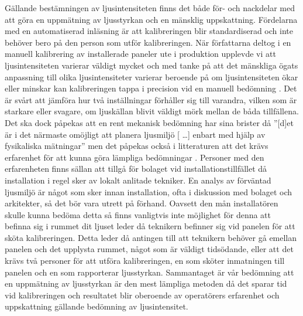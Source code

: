     Gällande bestämningen av ljusintensiteten finns det både för- och nackdelar med att göra en uppmätning av ljusstyrkan och en mänsklig uppskattning. Fördelarna med en automatiserad inläsning är att kalibreringen blir standardiserad och inte behöver bero på den person som utför kalibreringen. När författarna deltog i en manuell kalibrering av installerade paneler ute i produktion upplevde vi att ljusintensiteten varierar väldigt mycket och med tanke på att det mänskliga ögats anpassning till olika ljusintensiteter varierar beroende på om ljusintensiteten ökar eller minskar kan kalibreringen tappa i precision vid en manuell bedömning \cite[s.~273]{aot}.  Det är svårt att jämföra hur två inställningar förhåller sig till varandra, vilken som är starkare eller svagare, om ljuskällan blivit väldigt mörk mellan de båda tillfällena. Det ska dock påpekas att en rent mekanisk bedömning har sina brister då ''[d]et är i det närmaste omöjligt att planera ljusmiljö [ \dots ] enbart med hjälp av fysikaliska mätningar'' men det påpekas också i litteraturen att det krävs erfarenhet för att kunna göra lämpliga bedömningar \cite[s.~278]{aot}. Personer med den erfarenheten finns sällan att tillgå för bolaget vid installationstillfället då installation i regel sker av lokalt anlitade tekniker. En analys av förväntad ljusmiljö är något som sker innan installation, ofta i diskussion med bolaget och arkitekter, så det bör vara utrett på förhand. Oavsett den mån installatören skulle kunna bedöma detta så finns vanligtvis inte möjlighet för denna att befinna sig i rummet dit ljuset leder då teknikern befinner sig vid panelen för att sköta kalibreringen. Detta leder då antingen till att teknikern behöver gå emellan panelen och det upplysta rummet, något som är väldigt tidsödande, eller att det krävs två personer för att utföra kalibreringen, en som sköter inmatningen till panelen och en som rapporterar ljusstyrkan. Sammantaget är vår bedömning att en uppmätning av ljusstyrkan är den mest lämpliga metoden då det sparar tid vid kalibreringen och resultatet blir oberoende av operatörers erfarenhet och uppskattning gällande bedömning av ljusintensitet.

